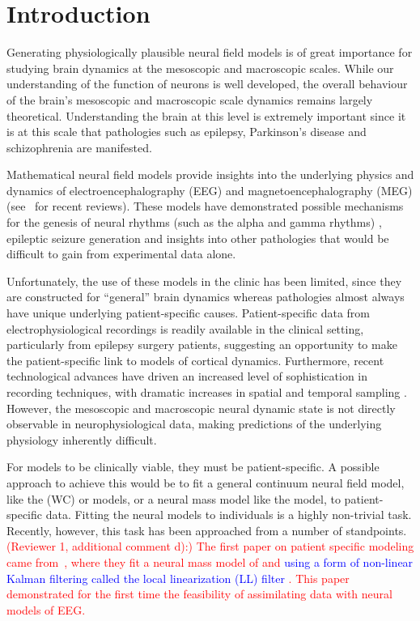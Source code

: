 \documentclass[review,authoryear,3p]{elsarticle}
\newcommand{\dean}[1]{\textcolor{red}{#1}}
\newcommand{\parham}[1]{\textcolor{blue}{#1}}
\begin{document}
\section{Introduction}

Generating physiologically plausible neural field models is of great importance for studying brain dynamics at the mesoscopic and macroscopic scales. While our understanding of the function of neurons is well developed, the overall behaviour of the brain's mesoscopic and macroscopic scale dynamics remains largely theoretical. Understanding the brain at this level is extremely important since it is at this scale that pathologies such as epilepsy, Parkinson's disease and schizophrenia are manifested. 

Mathematical neural field models provide insights into the underlying physics and dynamics of electroencephalography (EEG) and magnetoencephalography (MEG) (see~\citet{Deco2008,David2003} for recent reviews). These models have demonstrated possible mechanisms for the genesis of neural rhythms (such as the alpha and gamma rhythms) \citep{Liley1999,RENNIE2000}, epileptic seizure generation \citep{DaSilva2003,Suffczynski2004,Wendling2005} and insights into other pathologies \citep{Moran2008,Schiff2009} that would be difficult to gain from experimental data alone. 

Unfortunately, the use of these models in the clinic has been limited, since they are constructed for ``general'' brain dynamics whereas pathologies almost always have unique underlying patient-specific causes. Patient-specific data from electrophysiological recordings is readily available in the clinical setting, particularly from epilepsy surgery patients, suggesting an opportunity to make the patient-specific link to models of cortical dynamics. Furthermore, recent technological advances have driven an increased level of sophistication in recording techniques, with dramatic increases in spatial and temporal sampling \citep{Brinkmann2009}. However, the mesoscopic and macroscopic neural dynamic state is not directly observable in neurophysiological data, making predictions of the underlying physiology inherently difficult.

For models to be clinically viable, they must be patient-specific. A possible approach to achieve this would be to fit a general continuum neural field model, like the \citet{Wilson1973} (WC) or \citet{Amari1977} models, or a neural mass model like the \citet{Jansen1995} model, to patient-specific data. Fitting the neural models to individuals is a highly non-trivial task. Recently, however, this task has been approached from a number of standpoints. \dean{(Reviewer 1, additional comment d):) The first paper on patient specific modeling came from~\citet{Valdes1999}, where they fit a neural mass model of \citet{LopesDaSilva1976} and \citet{Zetterberg1978} \parham{using a form of non-linear Kalman filtering called the local linearization (LL) filter \citep{Ozaki1993,Ozaki1994,Ozaki2000}}. This paper demonstrated for the first time the feasibility of assimilating data with neural models of EEG.} 
\end{document}
